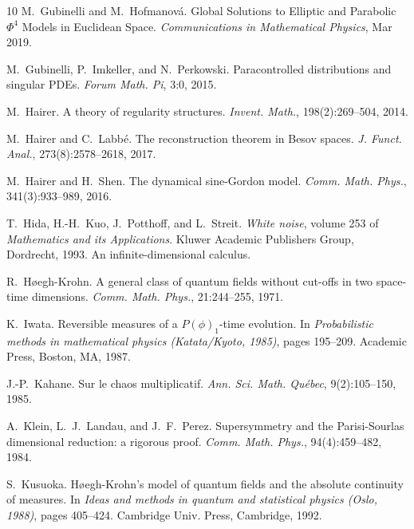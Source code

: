 \documentclass[a4paper,10pt]{article}
\newcommand{\tmtextit}[1]{{\itshape{#1}}}
\begin{document}
\begin{thebibliography}{10}
  M.~Gubinelli  and  M.~Hofmanov{\'a}. {\newblock}Global
  Solutions to Elliptic and Parabolic $\Phi^4$ Models in Euclidean Space.
  {\newblock}\tmtextit{Communications in Mathematical Physics}, Mar
  2019.{\newblock}
  
  M.~Gubinelli, P.~Imkeller, and  N.~Perkowski.
  {\newblock}Paracontrolled distributions and singular PDEs.
  {\newblock}\tmtextit{Forum Math. Pi}, 3:0, 2015.{\newblock}
  
  M.~Hairer. {\newblock}A theory of regularity
  structures. {\newblock}\tmtextit{Invent. Math.}, 198(2):269--504,
  2014.{\newblock}
  
  M.~Hairer  and  C.~Labb{\'e}. {\newblock}The
  reconstruction theorem in Besov spaces. {\newblock}\tmtextit{J. Funct.
  Anal.}, 273(8):2578--2618, 2017.{\newblock}
  
  M.~Hairer  and  H.~Shen. {\newblock}The dynamical
  sine-Gordon model. {\newblock}\tmtextit{Comm. Math. Phys.}, 341(3):933--989,
  2016.{\newblock}
  
  T.~Hida, H.-H.~Kuo, J.~Potthoff, and  L.~Streit.
  {\newblock}\tmtextit{White noise},  volume  253  of \tmtextit{Mathematics
  and its Applications}. {\newblock}Kluwer Academic Publishers Group,
  Dordrecht, 1993. {\newblock}An infinite-dimensional calculus.{\newblock}
  
  R.~H{\o}egh-Krohn. {\newblock}A general class of
  quantum fields without cut-offs in two space-time dimensions.
  {\newblock}\tmtextit{Comm. Math. Phys.}, 21:244--255, 1971.{\newblock}
  
  K.~Iwata. {\newblock}Reversible measures of a $P
  (\phi)_1$-time evolution. {\newblock}In \tmtextit{Probabilistic methods in
  mathematical physics (Katata/Kyoto, 1985)},  pages  195--209. Academic
  Press, Boston, MA, 1987.{\newblock}
  
  J.-P.~Kahane. {\newblock}Sur le chaos multiplicatif.
  {\newblock}\tmtextit{Ann. Sci. Math. Qu{\'e}bec}, 9(2):105--150,
  1985.{\newblock}
  
  A.~Klein, L.~J.~Landau, and  J.~F.~Perez.
  {\newblock}Supersymmetry and the Parisi-Sourlas dimensional reduction: a
  rigorous proof. {\newblock}\tmtextit{Comm. Math. Phys.}, 94(4):459--482,
  1984.{\newblock}
  
  S.~Kusuoka. {\newblock}H{\o}egh-Krohn's model of quantum
  fields and the absolute continuity of measures. {\newblock}In
  \tmtextit{Ideas and methods in quantum and statistical physics (Oslo,
  1988)},  pages  405--424. Cambridge Univ. Press, Cambridge, 1992.{\newblock}
  

\end{thebibliography}
\end{document}
